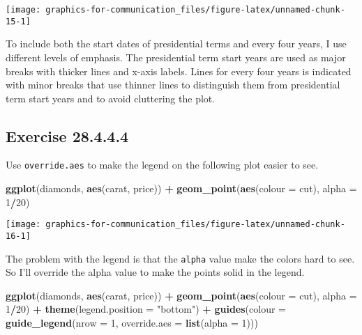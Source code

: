 \documentclass[]{book}
\newenvironment{Shaded}{\begin{snugshade}}{\end{snugshade}}
\newcommand{\DataTypeTok}[1]{\textcolor[rgb]{0.13,0.29,0.53}{#1}}
\newcommand{\DecValTok}[1]{\textcolor[rgb]{0.00,0.00,0.81}{#1}}
\newcommand{\KeywordTok}[1]{\textcolor[rgb]{0.13,0.29,0.53}{\textbf{#1}}}
\newcommand{\NormalTok}[1]{#1}
\newcommand{\OperatorTok}[1]{\textcolor[rgb]{0.81,0.36,0.00}{\textbf{#1}}}
\newcommand{\StringTok}[1]{\textcolor[rgb]{0.31,0.60,0.02}{#1}}
\theoremstyle{plain}
\theoremstyle{remark}
\begin{document}
\begin{center}\texttt{[image: graphics-for-communication\_files/figure-latex/unnamed-chunk-15-1]} \end{center}

To include both the start dates of presidential terms and every four
years, I use different levels of emphasis. The presidential term start
years are used as major breaks with thicker lines and x-axis labels.
Lines for every four years is indicated with minor breaks that use
thinner lines to distinguish them from presidential term start years and
to avoid cluttering the plot.

\hypertarget{exercise-28.4.4.4}{%
\subsection*{\texorpdfstring{Exercise
{28.4.4.4}}{Exercise 28.4.4.4}}\label{exercise-28.4.4.4}}

Use \texttt{override.aes} to make the legend on the following plot
easier to see.

\begin{Shaded}
\begin{Highlighting}[]
\KeywordTok{ggplot}\NormalTok{(diamonds, }\KeywordTok{aes}\NormalTok{(carat, price)) }\OperatorTok{+}
\StringTok{  }\KeywordTok{geom_point}\NormalTok{(}\KeywordTok{aes}\NormalTok{(}\DataTypeTok{colour =}\NormalTok{ cut), }\DataTypeTok{alpha =} \DecValTok{1}\OperatorTok{/}\DecValTok{20}\NormalTok{)}
\end{Highlighting}
\end{Shaded}

\begin{center}\texttt{[image: graphics-for-communication\_files/figure-latex/unnamed-chunk-16-1]} \end{center}

The problem with the legend is that the \texttt{alpha} value make the
colors hard to see. So I'll override the alpha value to make the points
solid in the legend.

\begin{Shaded}
\begin{Highlighting}[]
\KeywordTok{ggplot}\NormalTok{(diamonds, }\KeywordTok{aes}\NormalTok{(carat, price)) }\OperatorTok{+}
\StringTok{  }\KeywordTok{geom_point}\NormalTok{(}\KeywordTok{aes}\NormalTok{(}\DataTypeTok{colour =}\NormalTok{ cut), }\DataTypeTok{alpha =} \DecValTok{1}\OperatorTok{/}\DecValTok{20}\NormalTok{)  }\OperatorTok{+}
\StringTok{  }\KeywordTok{theme}\NormalTok{(}\DataTypeTok{legend.position =} \StringTok{"bottom"}\NormalTok{) }\OperatorTok{+}
\StringTok{  }\KeywordTok{guides}\NormalTok{(}\DataTypeTok{colour =} \KeywordTok{guide_legend}\NormalTok{(}\DataTypeTok{nrow =} \DecValTok{1}\NormalTok{, }\DataTypeTok{override.aes =} \KeywordTok{list}\NormalTok{(}\DataTypeTok{alpha =} \DecValTok{1}\NormalTok{)))  }
\end{Highlighting}
\end{Shaded}
\end{document}
